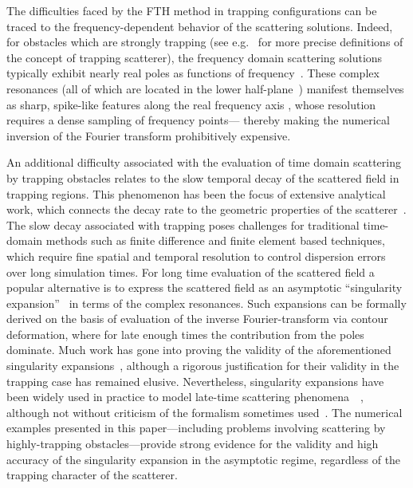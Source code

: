 \documentclass[11pt]{article}
\theoremstyle{plain}
\theoremstyle{remark}
\begin{document}
The difficulties faced by the FTH method in trapping configurations
can be traced to the frequency-dependent behavior of the scattering
solutions. Indeed, for obstacles which are strongly trapping (see
e.g.~\cite{anderson2020bootstrap,lafontaine2021most} for more precise
definitions of the concept of trapping scatterer), the frequency
domain scattering solutions typically exhibit nearly real poles as
functions of frequency~\cite{beale1973scattering}. These complex
resonances (all of which are located in the lower
half-plane~\cite{taylorbook}) manifest themselves as sharp, spike-like
features along the real frequency axis
\cite{betcke2011condition,pradovera2025surrogate,lafontaine2021most,darbas2013combining},
whose resolution requires a dense sampling of frequency
points---
thereby making the numerical inversion of the Fourier
transform prohibitively expensive.

An additional difficulty associated with the evaluation of time domain
scattering by trapping obstacles relates to the slow temporal decay of
the scattered field in trapping regions. This phenomenon has been the
focus of extensive analytical work, which connects the decay rate to
the geometric properties of the
scatterer~\cite{lax1969decaying,lax2005exponential,ikawa1982decay,morawetz1961decay,morawetz1966exponential,tang2000resonance,anderson2020bootstrap}. The
slow decay associated with trapping poses challenges for traditional
time-domain methods such as finite difference and finite element based
techniques, which require fine spatial and temporal resolution to
control dispersion errors over long simulation times. For long time
evaluation of the scattered field a popular alternative is to express
the scattered field as an asymptotic ``singularity
expansion''~\cite{baum2005singularity} in terms of the complex
resonances. Such expansions can be formally derived on the basis of
evaluation of the inverse Fourier-transform via contour deformation,
where for late enough times the contribution from the poles
dominate. Much work has gone into proving the validity of the
aforementioned singularity
expansions~\cite{tang2000resonance,vainberg1989asymptotic,lax1969decaying},
although a rigorous justification for their validity in the trapping
case has remained elusive. Nevertheless, singularity expansions have been
widely used in practice to model late-time scattering
phenomena~~\cite{baum2005singularity,wilks2024generalized,meylan2012complex,hazard2007singularity,heyman1985wavefront,meylan2014singularity,
  lalanne2018light}, although not without criticism of the formalism
sometimes used~\cite{heyman1985wavefront,dolph1980relationship,
  ramm1982mathematical}. The numerical examples presented in this
paper---including problems involving scattering by highly-trapping
obstacles---provide strong evidence for the validity and high accuracy
of the singularity expansion in the asymptotic regime, regardless of
the trapping character of the scatterer.
\end{document}
